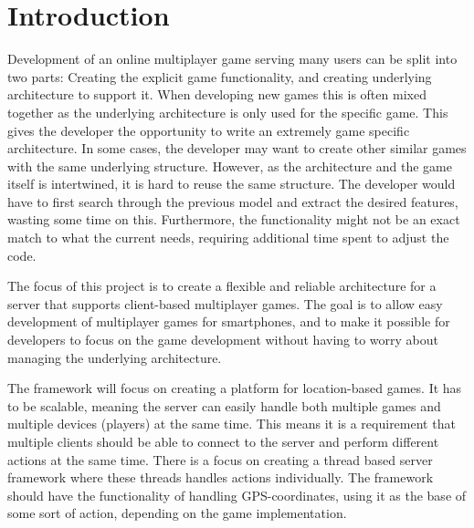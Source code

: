 \chapter{Introduction}
\label{chap:intro}




Development of an online multiplayer game serving many users can be split into two parts: Creating the explicit game functionality, and creating underlying architecture to support it. When developing new games this is often mixed together as the underlying architecture is only used for the specific game. This gives the developer the opportunity to write an extremely game specific architecture. In some cases, the developer may want to create other similar games with the same underlying structure. However, as the architecture and the game itself is intertwined, it is hard to reuse the same structure. The developer would have to first search through the previous model and extract the desired features, wasting some time on this. Furthermore, the functionality might not be an exact match to what the current needs, requiring additional time spent to adjust the code.

The focus of this project is to create a flexible and reliable architecture for a server that supports client-based multiplayer games. The goal is to allow easy development of multiplayer games for smartphones, and to make it possible for developers to focus on the game development without having to worry about managing the underlying architecture. 

The framework will focus on creating a platform for location-based games. It has to be scalable, meaning the server can easily handle both multiple games and multiple devices (players) at the same time. This means it is a requirement that multiple clients should be able to connect to the server and perform different actions at the same time. There is a focus on creating a thread based server framework where these threads handles actions individually. The framework should have the functionality of handling GPS-coordinates, using it as the base of some sort of action, depending on the game implementation. 

